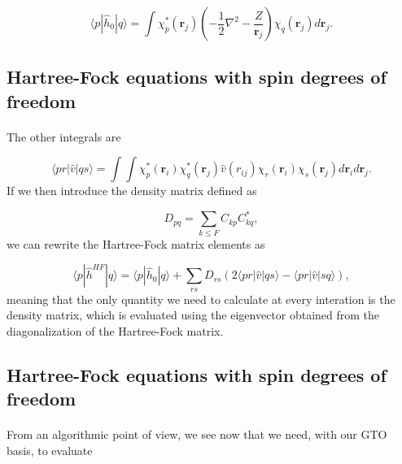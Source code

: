 \documentclass[%
twoside,                 %
final,                   %
10pt]{article}
\begin{document}
\[
\langle p|\hat{h}_0|q\rangle = \int \chi_{p}^*(\mathbf{r}_j)\left(-\frac{1}{2}\nabla^2-\frac{Z}{\mathbf{r}_j}  \right)\chi_{q}(\mathbf{r}_j)
  d\mathbf{r}_j.
\]



\subsection{Hartree-Fock equations with spin degrees of freedom}

\paragraph{}

The other integrals are

\begin{equation*}
\langle pr | \hat{v}|qs\rangle = \int\int \chi_{p}^*(\mathbf{r}_i)\chi_{q}^*(\mathbf{r}_j)\hat{v}(r_{ij})\chi_{r}(\mathbf{r}_i)\chi_{s}(\mathbf{r}_j)
  d\mathbf{r}_id\mathbf{r}_j.
\end{equation*}
If we then introduce the density matrix defined as

\begin{equation*}
D_{pq}=\sum_{k\le F}C_{kp}C_{kq}^*,
\end{equation*}
we can rewrite the Hartree-Fock matrix elements as

\begin{equation*}
\langle p | \hat{h}^{HF} | q \rangle = \langle p|\hat{h}_0|q\rangle +\sum_{rs}D_{rs}\left(2\langle pr | \hat{v}|qs\rangle-\langle pr | \hat{v}|sq\rangle\right),
\end{equation*}
meaning that the only quantity we need to calculate at every
interation is the density matrix, which is evaluated using the eigenvector 
obtained from the diagonalization of the Hartree-Fock matrix.



\subsection{Hartree-Fock equations with spin degrees of freedom}

\paragraph{}

From an algorithmic point of view, we see now that we need, with our GTO basis, to evaluate 
\end{document}
